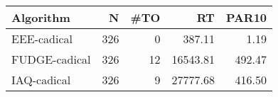 \begin{tabular}{lrrrr}
\toprule
    Algorithm &   N &  \#TO &       RT &  PAR10 \\
\midrule
  EEE-cadical & 326 &    0 &   387.11 &   1.19 \\
FUDGE-cadical & 326 &   12 & 16543.81 & 492.47 \\
  IAQ-cadical & 326 &    9 & 27777.68 & 416.50 \\
\bottomrule
\end{tabular}
